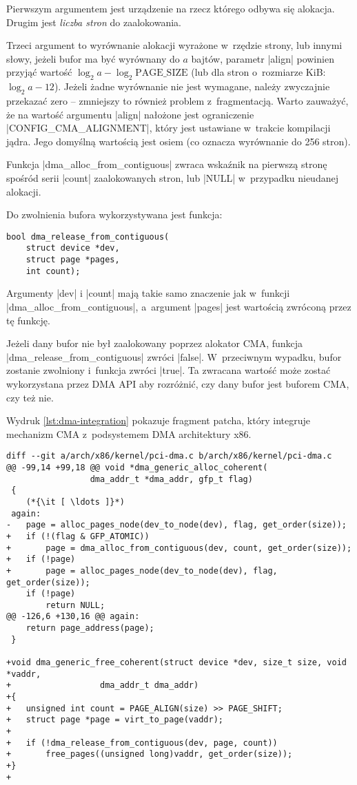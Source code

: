 Pierwszym argumentem jest urządzenie na rzecz którego odbywa się
alokacja.  Drugim jest \emph{liczba stron} do zaalokowania.

Trzeci argument to wyrównanie alokacji wyrażone w~rzędzie strony, lub
innymi słowy, jeżeli bufor ma być wyrównany do $a$ bajtów, parametr
\code|align| powinien przyjąć wartość $\log_2 a - \log_2
\mathrm{PAGE\_SIZE}$ (lub dla stron o~rozmiarze \unit[4096]{KiB}:
$\log_2 a - 12$).  Jeżeli żadne wyrównanie nie jest wymagane, należy
zwyczajnie przekazać zero -- zmniejszy to również problem
z~fragmentacją.  Warto zauważyć, że na wartość argumentu
\code|align| nałożone jest ograniczenie
\code|CONFIG_CMA_ALIGNMENT|, który jest ustawiane w~trakcie
kompilacji jądra.  Jego domyślną wartością jest osiem (co oznacza
wyrównanie do 256 stron).

Funkcja \code|dma_alloc_from_contiguous| zwraca wskaźnik na
pierwszą stronę spośród serii \code|count| zaalokowanych stron,
lub \code|NULL| w~przypadku nieudanej alokacji.

Do zwolnienia bufora wykorzystywana jest funkcja:

\begin{lstlisting}
bool dma_release_from_contiguous(
	struct device *dev,
	struct page *pages,
	int count);
\end{lstlisting}

Argumenty \code|dev| i \code|count| mają takie samo
znaczenie jak w~funkcji \code|dma_alloc_from_contiguous|,
a~argument \code|pages| jest wartością zwróconą przez tę funkcję.

Jeżeli dany bufor nie był zaalokowany poprzez alokator CMA, funkcja
\code|dma_release_from_contiguous| zwróci \code|false|.  W~przeciwnym
wypadku, bufor zostanie zwolniony i~funkcja zwróci \code|true|.  Ta
zwracana wartość może zostać wykorzystana przez DMA API aby rozróżnić,
czy dany bufor jest buforem CMA, czy też nie.

Wydruk \ref{lst:dma-integration} pokazuje fragment patcha, który
integruje mechanizm CMA z~podsystemem DMA architektury x86.

\begin{lstlisting}[float=bht,caption={Integracja alokatora CMA z~podsystemem DMA
      architektury x86.},label=lst:dma-integration]
diff --git a/arch/x86/kernel/pci-dma.c b/arch/x86/kernel/pci-dma.c
@@ -99,14 +99,18 @@ void *dma_generic_alloc_coherent(
 				 dma_addr_t *dma_addr, gfp_t flag)
 {
	(*{\it [ \ldots ]}*)
 again:
-	page = alloc_pages_node(dev_to_node(dev), flag, get_order(size));
+	if (!(flag & GFP_ATOMIC))
+		page = dma_alloc_from_contiguous(dev, count, get_order(size));
+	if (!page)
+		page = alloc_pages_node(dev_to_node(dev), flag, get_order(size));
 	if (!page)
 		return NULL;
@@ -126,6 +130,16 @@ again:
 	return page_address(page);
 }

+void dma_generic_free_coherent(struct device *dev, size_t size, void *vaddr,
+			       dma_addr_t dma_addr)
+{
+	unsigned int count = PAGE_ALIGN(size) >> PAGE_SHIFT;
+	struct page *page = virt_to_page(vaddr);
+
+	if (!dma_release_from_contiguous(dev, page, count))
+		free_pages((unsigned long)vaddr, get_order(size));
+}
+
\end{lstlisting}

